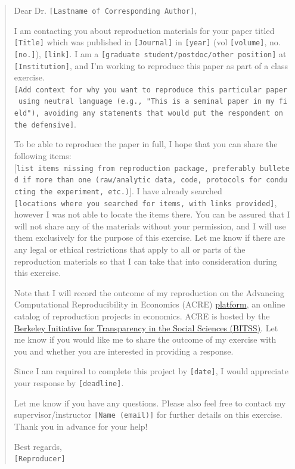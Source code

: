 \documentclass[]{book}
\begin{document}
\begin{quote}
Dear Dr. \texttt{{[}Lastname\ of\ Corresponding\ Author{]}},

I am contacting you about reproduction materials for your paper titled \texttt{{[}Title{]}} which was published in \texttt{{[}Journal{]}} in \texttt{{[}year{]}} (vol \texttt{{[}volume{]}}, no. \texttt{{[}no.{]}}), \texttt{{[}link{]}}.
I am a \texttt{{[}graduate\ student/postdoc/other\ position{]}} at \texttt{{[}Institution{]}}, and I'm working to reproduce this paper as part of a class exercise. \texttt{{[}Add\ context\ for\ why\ you\ want\ to\ reproduce\ this\ particular\ paper\ using\ neutral\ language\ (e.g.,\ "This\ is\ a\ seminal\ paper\ in\ my\ field"),\ avoiding\ any\ statements\ that\ would\ put\ the\ respondent\ on\ the\ defensive{]}}.

To be able to reproduce the paper in full, I hope that you can share the following items: {[}\texttt{list\ items\ missing\ from\ reproduction\ package,\ preferably\ bulleted\ if\ more\ than\ one\ (raw/analytic\ data,\ code,\ protocols\ for\ conducting\ the\ experiment,\ etc.)}{]}. I have already searched \texttt{{[}locations\ where\ you\ searched\ for\ items,\ with\ links\ provided{]}}, however I was not able to locate the items there. You can be assured that I will not share any of the materials without your permission, and I will use them exclusively for the purpose of this exercise. Let me know if there are any legal or ethical restrictions that apply to all or parts of the reproduction materials so that I can take that into consideration during this exercise.

Note that I will record the outcome of my reproduction on the Advancing Computational Reproducibility in Economics (ACRE) \href{https://www.bitss.org/ecosystem/acre/}{platform}, an online catalog of reproduction projects in economics. ACRE is hosted by the \href{https://www.bitss.org/}{Berkeley Initiative for Transparency in the Social Sciences (BITSS)}. Let me know if you would like me to share the outcome of my exercise with you and whether you are interested in providing a response.

Since I am required to complete this project by \texttt{{[}date{]}}, I would appreciate your response by \texttt{{[}deadline{]}}.

Let me know if you have any questions. Please also feel free to contact my supervisor/instructor \texttt{{[}Name\ (email){]}} for further details on this exercise. Thank you in advance for your help!

Best regards,\\
\texttt{{[}Reproducer{]}}
\end{quote}
\end{document}
